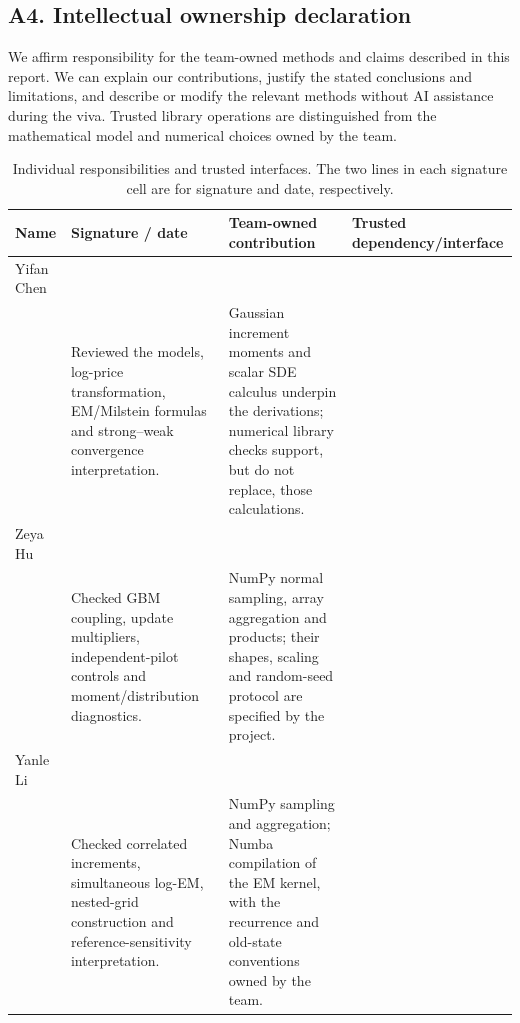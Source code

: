 \subsection*{A4. Intellectual ownership declaration}
We affirm responsibility for the team-owned methods and claims described in this report. We can explain our contributions, justify the stated conclusions and limitations, and describe or modify the relevant methods without AI assistance during the viva. Trusted library operations are distinguished from the mathematical model and numerical choices owned by the team.
\begin{table}[H]\centering\small
\caption{Individual responsibilities and trusted interfaces. The two lines in each signature cell are for signature and date, respectively.}\label{tab:ownership}
\begin{tabular}{@{}>{\raggedright\arraybackslash}p{2.2cm}>{\raggedright\arraybackslash}p{1.7cm}>{\raggedright\arraybackslash}p{5.4cm}>{\raggedright\arraybackslash}p{5.3cm}@{}}\toprule
Name & Signature / date & Team-owned contribution & Trusted dependency/interface\\\midrule
Yifan Chen & \shortstack[l]{\underline{\hspace{1.3cm}}\\[3mm]\underline{\hspace{1.3cm}}} & Reviewed the models, log-price transformation, EM/Milstein formulas and strong--weak convergence interpretation. & Gaussian increment moments and scalar SDE calculus underpin the derivations; numerical library checks support, but do not replace, those calculations.\\[5mm]
Zeya Hu & \shortstack[l]{\underline{\hspace{1.3cm}}\\[3mm]\underline{\hspace{1.3cm}}} & Checked GBM coupling, update multipliers, independent-pilot controls and moment/distribution diagnostics. & NumPy normal sampling, array aggregation and products; their shapes, scaling and random-seed protocol are specified by the project.\\[5mm]
Yanle Li & \shortstack[l]{\underline{\hspace{1.3cm}}\\[3mm]\underline{\hspace{1.3cm}}} & Checked correlated increments, simultaneous log-EM, nested-grid construction and reference-sensitivity interpretation. & NumPy sampling and aggregation; Numba compilation of the EM kernel, with the recurrence and old-state conventions owned by the team.\\[5mm]

\end{tabular}
\end{table}
